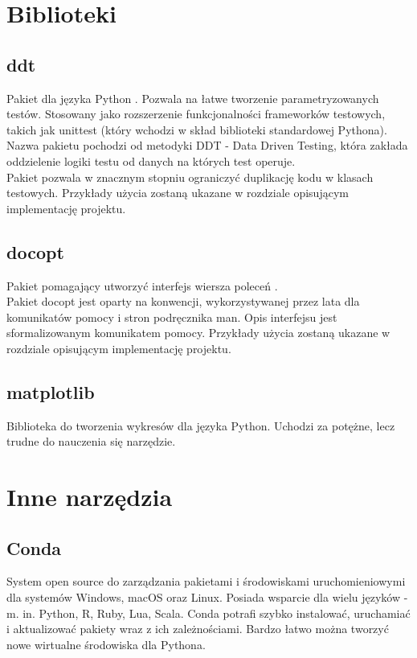 \section{Biblioteki}
\subsection{ddt}
Pakiet dla języka Python \cite{ddt:documentation}. Pozwala na łatwe tworzenie parametryzowanych testów. Stosowany jako rozszerzenie funkcjonalności frameworków testowych, takich jak unittest (który wchodzi w skład biblioteki standardowej Pythona).
Nazwa pakietu pochodzi od metodyki DDT - Data Driven Testing, która zakłada oddzielenie logiki testu od danych na których test operuje. \\
Pakiet pozwala w znacznym stopniu ograniczyć duplikację kodu w klasach testowych. Przykłady użycia zostaną ukazane w rozdziale opisującym implementację projektu.
\subsection{docopt}
Pakiet pomagający utworzyć interfejs wiersza poleceń \cite{docopt:documentation}. \\
Pakiet docopt jest oparty na konwencji, wykorzystywanej przez lata dla komunikatów pomocy i stron podręcznika man. Opis interfejsu jest sformalizowanym komunikatem pomocy.
Przykłady użycia zostaną ukazane w rozdziale opisującym implementację projektu.
\subsection{matplotlib}
Biblioteka do tworzenia wykresów dla języka Python. Uchodzi za potężne, lecz trudne do nauczenia się narzędzie.
\section{Inne narzędzia}
\subsection{Conda}
System open source do zarządzania pakietami i środowiskami uruchomieniowymi dla systemów Windows, macOS oraz Linux. Posiada wsparcie dla wielu języków - m. in. Python, R, Ruby, Lua, Scala.\cite{conda:documentation}
Conda potrafi szybko instalować, uruchamiać i aktualizować pakiety wraz z ich zależnościami.
Bardzo łatwo można tworzyć nowe wirtualne środowiska dla Pythona.

